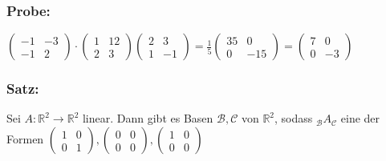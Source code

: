 \subsubsection{Probe:}
$\begin{pmatrix} -1 & -3 \\ -1 & 2 \end{pmatrix} \cdot \begin{pmatrix} 1 & 12 \\ 2 & 3 \end{pmatrix} \begin{pmatrix}2 & 3 \\ 1 & -1 \end{pmatrix} = \frac{1}{5} \begin{pmatrix} 35 & 0 \\ 0 & -15 \end{pmatrix} = \begin{pmatrix} 7 & 0 \\ 0 & -3 \end{pmatrix}$
%
%
%
\subsubsection{Satz:}
Sei $A: \mathbb{R}^{2} \rightarrow \mathbb{R}^{2}$ linear. Dann gibt es Basen $\mathcal{B}, \mathcal{C}$ von $\mathbb{R}^{2}$, sodass $_{\mathcal{B}}A_{\mathcal{C}}$ eine der Formen $\begin{pmatrix} 1 & 0 \\ 0 & 1 \end{pmatrix}, \begin{pmatrix} 0 & 0 \\ 0 & 0 \end{pmatrix}, \begin{pmatrix} 1 & 0 \\ 0 & 0 \end{pmatrix}$
%
%
%
